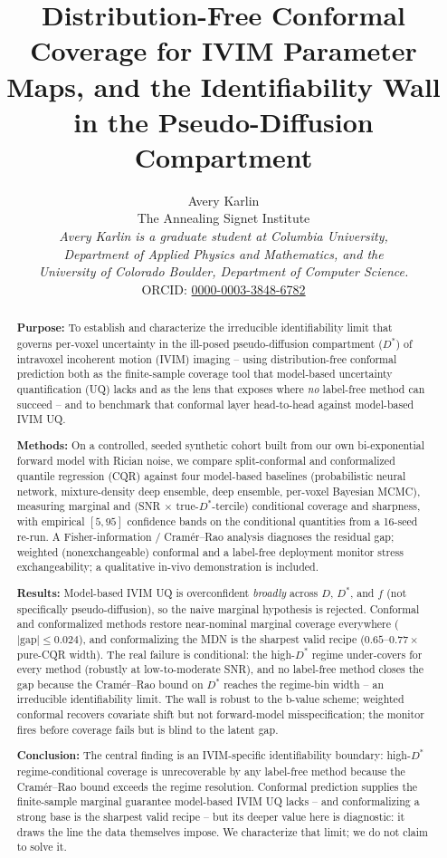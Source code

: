 \documentclass[11pt]{article}
\title{\textbf{Distribution-Free Conformal Coverage for IVIM Parameter
Maps, and the Identifiability Wall in the Pseudo-Diffusion Compartment}}
\author{Avery Karlin\\[2pt]
\small The Annealing Signet Institute\\[3pt]
\small \textit{Avery Karlin is a graduate student at Columbia University,}\\[1pt]
\small \textit{Department of Applied Physics and Mathematics, and the}\\[1pt]
\small \textit{University of Colorado Boulder, Department of Computer Science.}\\[3pt]
\small ORCID: \href{https://orcid.org/0000-0003-3848-6782}{0000-0003-3848-6782}}
\date{}
\newcommand{\Dstar}{D^{*}}
\begin{document}
\maketitle

\begin{abstract}
\noindent
\textbf{Purpose:} To establish and characterize the irreducible identifiability
limit that governs per-voxel uncertainty in the ill-posed pseudo-diffusion
compartment ($\Dstar$) of intravoxel incoherent motion (IVIM) imaging -- using
distribution-free conformal prediction both as the finite-sample coverage tool
that model-based uncertainty quantification (UQ) lacks and as the lens that
exposes where \emph{no} label-free method can succeed -- and to benchmark that
conformal layer head-to-head against model-based IVIM UQ.

\noindent
\textbf{Methods:} On a controlled, seeded synthetic cohort built from our own
bi-exponential forward model with Rician noise, we compare split-conformal and
conformalized quantile regression (CQR) against four model-based baselines
(probabilistic neural network, mixture-density deep ensemble, deep ensemble,
per-voxel Bayesian MCMC), measuring marginal and (SNR $\times$
true-$\Dstar$-tercile) conditional coverage and sharpness, with empirical
$[5,95]$ confidence bands on the conditional quantities from a 16-seed re-run. A
Fisher-information / Cram\'er--Rao analysis diagnoses the residual gap; weighted
(nonexchangeable) conformal and a label-free deployment monitor stress
exchangeability; a qualitative in-vivo demonstration is included.

\noindent
\textbf{Results:} Model-based IVIM UQ is overconfident \emph{broadly} across $D$,
$\Dstar$, and $f$ (not specifically pseudo-diffusion), so the naive marginal
hypothesis is rejected. Conformal and conformalized methods restore near-nominal
marginal coverage everywhere ($|\text{gap}|\le 0.024$), and conformalizing the MDN
is the sharpest valid recipe ($0.65$--$0.77\times$ pure-CQR width). The real
failure is conditional: the high-$\Dstar$ regime under-covers for every method
(robustly at low-to-moderate SNR), and no label-free method closes the gap because the Cram\'er--Rao bound
on $\Dstar$ reaches the regime-bin width -- an irreducible identifiability limit.
The wall is robust to the b-value scheme; weighted conformal recovers covariate
shift but not forward-model misspecification; the monitor fires before coverage
fails but is blind to the latent gap.

\noindent
\textbf{Conclusion:} The central finding is an IVIM-specific identifiability
boundary: high-$\Dstar$ regime-conditional coverage is unrecoverable by any
label-free method because the Cram\'er--Rao bound exceeds the regime resolution.
Conformal prediction supplies the finite-sample marginal guarantee model-based
IVIM UQ lacks -- and conformalizing a strong base is the sharpest valid recipe --
but its deeper value here is diagnostic: it draws the line the data themselves
impose. We characterize that limit; we do not claim to solve it.
\end{abstract}
\end{document}
